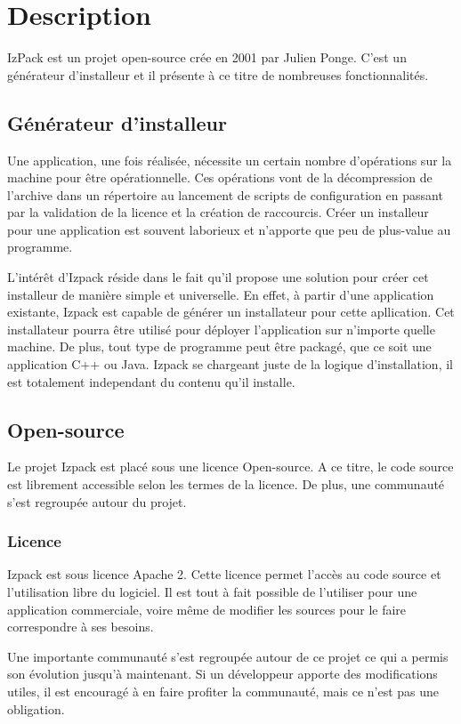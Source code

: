\section{Description}
IzPack est un projet open-source crée en 2001 par Julien Ponge. C'est un générateur d'installeur et il présente à ce titre de nombreuses fonctionnalités.
\subsection{Générateur d'installeur}
Une application, une fois réalisée, nécessite un certain nombre d'opérations sur la machine pour être opérationnelle.
Ces opérations vont de la décompression de l'archive dans un répertoire au lancement de scripts de configuration en passant par la validation de la licence et la création de raccourcis.
Créer un installeur pour une application est souvent laborieux et n'apporte que peu de plus-value au programme. 

L'intérêt d'Izpack réside dans le fait qu'il propose une solution pour créer cet installeur de manière simple et universelle.
En effet, à partir d'une application existante, Izpack est capable de générer un installateur pour cette apllication. Cet installateur pourra être utilisé pour déployer l'application sur n'importe quelle machine.
De plus, tout type de programme peut être packagé, que ce soit une application C++ ou Java. Izpack se chargeant juste de la logique d'installation, il est totalement independant du contenu qu'il installe.
\subsection{Open-source}
Le projet Izpack est placé sous une licence Open-source. A ce titre, le code source est librement accessible selon les termes de la licence. De plus, une communauté s'est regroupée autour du projet.
\subsubsection{Licence}
Izpack est sous licence Apache 2. Cette licence permet l'accès au code source et l'utilisation libre du logiciel.
Il est tout à fait possible de l'utiliser pour une application commerciale, voire même de modifier les sources pour le faire correspondre à ses besoins.

Une importante communauté s'est regroupée autour de ce projet ce qui a permis son évolution jusqu'à maintenant.
Si un développeur apporte des modifications utiles, il est encouragé à en faire profiter la communauté, mais ce n'est pas une obligation.
